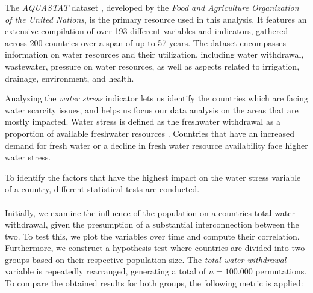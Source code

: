 \documentclass{article}
\theoremstyle{plain}
\theoremstyle{definition}
\theoremstyle{remark}
\begin{document}
The \textit{AQUASTAT} dataset \cite{FAO2021}, developed by the \textit{Food and Agriculture Organization of the United Nations}, is the primary resource used in this analysis. It features an extensive compilation of over 193 different variables and indicators, gathered across 200 countries over a span of up to 57 years. The dataset encompasses information on water resources and their utilization, including water withdrawal, wastewater, pressure on water resources, as well as aspects related to irrigation, drainage, environment, and health.

Analyzing the \textit{water stress} indicator lets us identify the countries which are facing water scarcity issues, and helps us focus our data analysis on the areas that are mostly impacted.
Water stress is defined as the freshwater withdrawal as a proportion of available freshwater resources \cite{UN_SDG642}. Countries that have an increased demand for fresh water or a decline in fresh water resource availability face higher water stress.\\

To identify the factors that have the highest impact on the water stress variable of a country, different statistical tests are conducted.\\\\
Initially, we examine the influence of the population on a countries total water withdrawal, given the presumption of a substantial interconnection between the two. To test this, we plot the variables over time and compute their correlation. Furthermore, we construct a hypothesis test where countries are divided into two groups based on their respective population size. The \textit{total water withdrawal} variable is repeatedly rearranged, generating a total of $n = 100.000$ permutations. To compare the obtained results for both groups, the following metric is applied:
\end{document}
